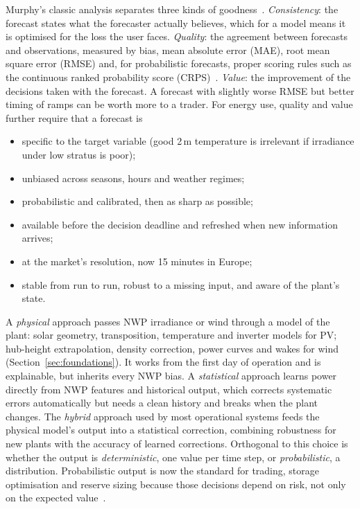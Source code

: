  Murphy's classic analysis separates three kinds of goodness~\cite{murphy1993good}. \emph{Consistency}: the forecast states what the forecaster actually believes, which for a model means it is optimised for the loss the user faces. \emph{Quality}: the agreement between forecasts and observations, measured by bias, mean absolute error (MAE), root mean square error (RMSE) and, for probabilistic forecasts, proper scoring rules such as the continuous ranked probability score (CRPS)~\cite{gneiting2007scoring}. \emph{Value}: the improvement of the decisions taken with the forecast. A forecast with slightly worse RMSE but better timing of ramps can be worth more to a trader. For energy use, quality and value further require that a forecast is
\begin{itemize}
\item specific to the target variable (good 2\,m temperature is irrelevant if irradiance under low stratus is poor);
\item unbiased across seasons, hours and weather regimes;
\item probabilistic and calibrated, then as sharp as possible;
\item available before the decision deadline and refreshed when new information arrives;
\item at the market's resolution, now 15 minutes in Europe;
\item stable from run to run, robust to a missing input, and aware of the plant's state.
\end{itemize}

 A \emph{physical} approach passes NWP irradiance or wind through a model of the plant: solar geometry, transposition, temperature and inverter models for PV; hub-height extrapolation, density correction, power curves and wakes for wind (Section~\ref{sec:foundations}). It works from the first day of operation and is explainable, but inherits every NWP bias. A \emph{statistical} approach learns power directly from NWP features and historical output, which corrects systematic errors automatically but needs a clean history and breaks when the plant changes. The \emph{hybrid} approach used by most operational systems feeds the physical model's output into a statistical correction, combining robustness for new plants with the accuracy of learned corrections. Orthogonal to this choice is whether the output is \emph{deterministic}, one value per time step, or \emph{probabilistic}, a distribution. Probabilistic output is now the standard for trading, storage optimisation and reserve sizing because those decisions depend on risk, not only on the expected value~\cite{hong2016gefcom,pinson2013wind}.
